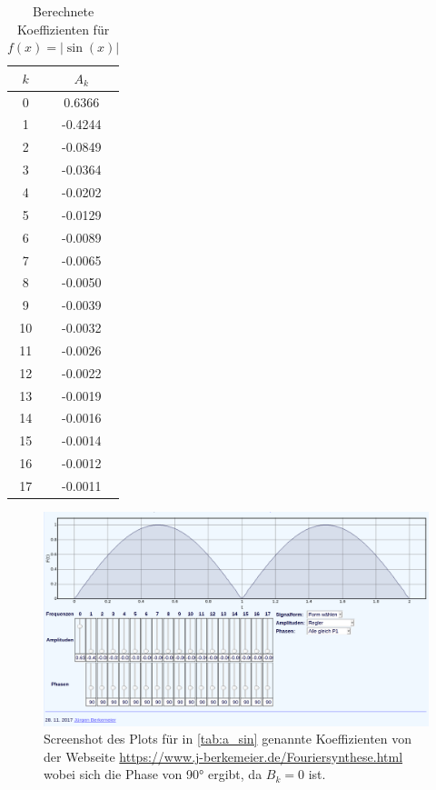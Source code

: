 \begin{table}
  \centering
  \caption{Berechnete Koeffizienten für $f(x)=|\sin(x)|$}
  \label{tab:a_sin}
  \begin{tabular}{c c}
    \toprule 
    $k$ & $A_k$ \\ 
    \midrule 
    0 & 0.6366 \\
    1 & -0.4244 \\
    2 & -0.0849 \\
    3 & -0.0364 \\
    4 & -0.0202 \\
    5 & -0.0129 \\
    6 & -0.0089 \\
    7 & -0.0065 \\
    8 & -0.0050 \\
    9 & -0.0039 \\
    10 & -0.0032 \\
    11 & -0.0026 \\
    12 & -0.0022 \\
    13 & -0.0019 \\
    14 & -0.0016 \\
    15 & -0.0014 \\
    16 & -0.0012 \\
    17 & -0.0011 \\ 
    \bottomrule
  \end{tabular}
\end{table}

\begin{figure}
  \centering
  \includegraphics[width=\textwidth]{sin-plot.png}
  \caption{Screenshot des Plots für in \autoref{tab:a_sin} genannte Koeffizienten von der Webseite \href{https://www.j-berkemeier.de/Fouriersynthese.html}{https://www.j-berkemeier.de/Fouriersynthese.html} wobei sich die Phase von 90° ergibt, da $B_k=0$ ist.}
\end{figure}